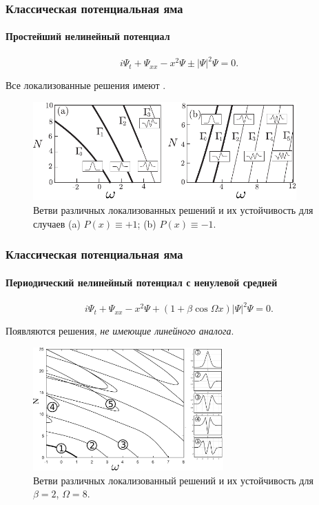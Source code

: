 \documentclass [10pt] {beamer}
\begin{document}
\begin{frame}
	\frametitle{Классическая потенциальная яма}
	\framesubtitle{Простейший нелинейный потенциал\footnotemark[7]}
	
	\begin{equation}
		i \Psi_t + \Psi_{xx} - x^2 \Psi \pm |\Psi|^2 \Psi = 0.
	\end{equation}
	
	Все локализованные решения имеют {\it {}}.
	
	\begin{figure}
		\includegraphics[width=0.9\textwidth]{pic/solution_branches_simple.pdf}
		\caption{Ветви различных локализованных решений и их устойчивость для случаев {\color{ceruleanblue} (a)} $P(x) \equiv +1$; {\color{ceruleanblue} (b)} $P(x) \equiv -1$.}
		\label{pic:branches_simple}
	\end{figure}
	
\end{frame}

\begin{frame}
	\frametitle{Классическая потенциальная яма}
	\framesubtitle{Периодический нелинейный потенциал с ненулевой средней}
	
	\begin{equation}
		i \Psi_t + \Psi_{xx} - x^2 \Psi + (1 + \beta \cos \Omega x) |\Psi|^2 \Psi = 0.
	\end{equation}

	Появляются решения, {\it не имеющие линейного аналога}.

	\begin{figure}
		\includegraphics[width=0.65\textwidth]{pic/solution_branches_nonzero_mean.pdf}
		\caption{Ветви различных локализованный решений и их устойчивость для $\beta = 2$, $\Omega = 8$.}
		\label{pic:branches_nonzero_mean}
	\end{figure}	
	
\end{frame}
\end{document}
